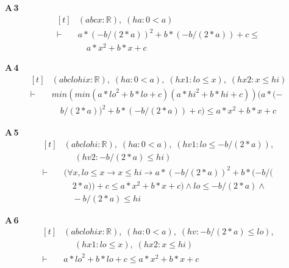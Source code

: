 \noindent\textbf{A\,3}\quad{}
{\footnotesize\[ \begin{aligned}[t]
&(\mathit{a} \mathit{b} \mathit{c} \mathit{x} : \mathbb{R} ),\; (\mathit{ha} : 0 < \mathit{a})\\
\vdash\;&\mathit{a} * (-\mathit{b} / (2 * \mathit{a})) ^{2} + \mathit{b} * (-\mathit{b} / (2 * \mathit{a})) + \mathit{c} \leq\\
&\quad \mathit{a} * \mathit{x} ^{2} + \mathit{b} * \mathit{x} + \mathit{c}
\end{aligned} \]}

\noindent\textbf{A\,4}\quad{}
{\footnotesize\[ \begin{aligned}[t]
&(\mathit{a} \mathit{b} \mathit{c} \mathit{lo} \mathit{hi} \mathit{x} : \mathbb{R} ),\; (\mathit{ha} : 0 < \mathit{a}),\; (\mathit{hx1} : \mathit{lo} \leq \mathit{x}),\; (\mathit{hx2} : \mathit{x} \leq \mathit{hi})\\
\vdash\;&\mathit{min} (\mathit{min} (\mathit{a} * \mathit{lo} ^{2} + \mathit{b} * \mathit{lo} + \mathit{c}) (\mathit{a} * \mathit{hi} ^{2} + \mathit{b} * \mathit{hi} + \mathit{c})) (\mathit{a} * (-\\
&\quad \mathit{b} / (2 * \mathit{a})) ^{2} + \mathit{b} * (-\mathit{b} / (2 * \mathit{a})) + \mathit{c}) \leq \mathit{a} * \mathit{x} ^{2} + \mathit{b} * \mathit{x} + \mathit{c}
\end{aligned} \]}

\noindent\textbf{A\,5}\quad{}
{\footnotesize\[ \begin{aligned}[t]
&(\mathit{a} \mathit{b} \mathit{c} \mathit{lo} \mathit{hi} : \mathbb{R} ),\; (\mathit{ha} : 0 < \mathit{a}),\; (\mathit{hv1} : \mathit{lo} \leq -\mathit{b} / (2 * \mathit{a})),\\
&\quad \; (\mathit{hv2} : -\mathit{b} / (2 * \mathit{a}) \leq \mathit{hi})\\
\vdash\;&(\forall \mathit{x}, \mathit{lo} \leq \mathit{x} \to \mathit{x} \leq \mathit{hi} \to \mathit{a} * (-\mathit{b} / (2 * \mathit{a})) ^{2} + \mathit{b} * (-\mathit{b} / (\\
&\quad 2 * \mathit{a})) + \mathit{c} \leq \mathit{a} * \mathit{x} ^{2} + \mathit{b} * \mathit{x} + \mathit{c}) \wedge \mathit{lo} \leq -\mathit{b} / (2 * \mathit{a}) \wedge\\
&\quad -\mathit{b} / (2 * \mathit{a}) \leq \mathit{hi}
\end{aligned} \]}

\noindent\textbf{A\,6}\quad{}
{\footnotesize\[ \begin{aligned}[t]
&(\mathit{a} \mathit{b} \mathit{c} \mathit{lo} \mathit{hi} \mathit{x} : \mathbb{R} ),\; (\mathit{ha} : 0 < \mathit{a}),\; (\mathit{hv} : -\mathit{b} / (2 * \mathit{a}) \leq \mathit{lo}),\\
&\quad \; (\mathit{hx1} : \mathit{lo} \leq \mathit{x}),\; (\mathit{hx2} : \mathit{x} \leq \mathit{hi})\\
\vdash\;&\mathit{a} * \mathit{lo} ^{2} + \mathit{b} * \mathit{lo} + \mathit{c} \leq \mathit{a} * \mathit{x} ^{2} + \mathit{b} * \mathit{x} + \mathit{c}
\end{aligned} \]}

